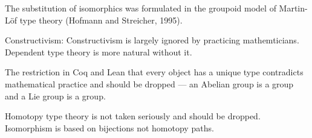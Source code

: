 \vfill
The substitution of isomorphics was formulated in the groupoid model of Martin-L\"{o}f type theory (Hofmann and Streicher, 1995).


Constructivism: Constructivism is largely ignored by practicing mathemticians. Dependent type theory is more natural without it.

\vfill
The restriction in Coq and Lean that every object has a unique type contradicts mathematical practice and should
be dropped --- an Abelian group is a group and a Lie group is a group.


\vfill
Homotopy type theory is not taken seriously and should be dropped.  Isomorphism is based on bijections not
homotopy paths.

